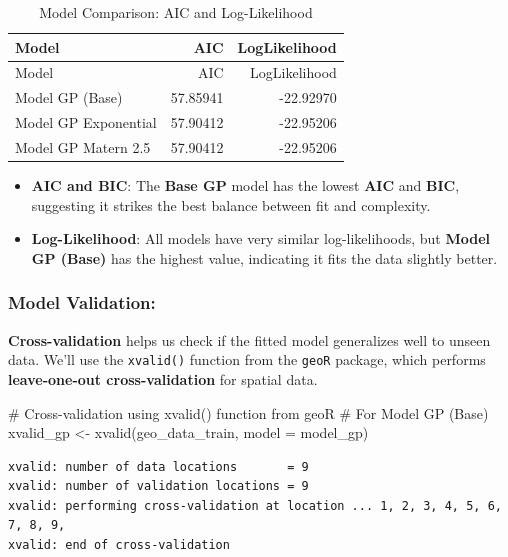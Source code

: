 \documentclass[
  11pt,
]{article}
\newenvironment{Shaded}{\begin{snugshade}}{\end{snugshade}}
\newcommand{\AttributeTok}[1]{\textcolor[rgb]{0.40,0.45,0.13}{#1}}
\newcommand{\CommentTok}[1]{\textcolor[rgb]{0.37,0.37,0.37}{#1}}
\newcommand{\FunctionTok}[1]{\textcolor[rgb]{0.28,0.35,0.67}{#1}}
\newcommand{\NormalTok}[1]{\textcolor[rgb]{0.00,0.23,0.31}{#1}}
\newcommand{\OtherTok}[1]{\textcolor[rgb]{0.00,0.23,0.31}{#1}}
\providecommand{\tightlist}{%
  \setlength{\itemsep}{0pt}\setlength{\parskip}{0pt}}\usepackage{longtable,booktabs,array}
\begin{document}
\begin{longtable}[]{@{}lrr@{}}
\caption{Model Comparison: AIC and Log-Likelihood}\tabularnewline
\toprule\noalign{}
Model & AIC & LogLikelihood \\
\midrule\noalign{}
\endfirsthead
\toprule\noalign{}
Model & AIC & LogLikelihood \\
\midrule\noalign{}
\endhead
\bottomrule\noalign{}
\endlastfoot
Model GP (Base) & 57.85941 & -22.92970 \\
Model GP Exponential & 57.90412 & -22.95206 \\
Model GP Matern 2.5 & 57.90412 & -22.95206 \\
\end{longtable}

\begin{itemize}
\tightlist
\item
  \textbf{AIC and BIC}: The \textbf{Base GP} model has the lowest
  \textbf{AIC} and \textbf{BIC}, suggesting it strikes the best balance
  between fit and complexity.
\item
  \textbf{Log-Likelihood}: All models have very similar log-likelihoods,
  but \textbf{Model GP (Base)} has the highest value, indicating it fits
  the data slightly better.
\end{itemize}

\subsubsection{Model Validation:}\label{model-validation-1}

\textbf{Cross-validation} helps us check if the fitted model generalizes
well to unseen data. We'll use the \texttt{xvalid()} function from the
\texttt{geoR} package, which performs \textbf{leave-one-out
cross-validation} for spatial data.

\begin{Shaded}
\begin{Highlighting}[]
\CommentTok{\# Cross{-}validation using xvalid() function from geoR}
\CommentTok{\# For Model GP (Base)}
\NormalTok{xvalid\_gp }\OtherTok{\textless{}{-}} \FunctionTok{xvalid}\NormalTok{(geo\_data\_train, }\AttributeTok{model =}\NormalTok{ model\_gp)}
\end{Highlighting}
\end{Shaded}

\begin{verbatim}
xvalid: number of data locations       = 9
xvalid: number of validation locations = 9
xvalid: performing cross-validation at location ... 1, 2, 3, 4, 5, 6, 7, 8, 9, 
xvalid: end of cross-validation
\end{verbatim}
\end{document}
